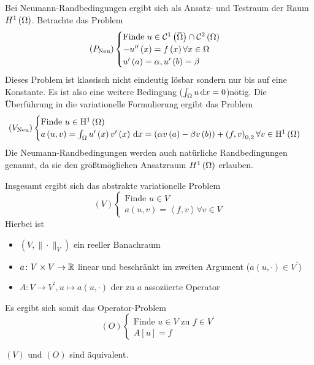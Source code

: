 Bei Neumann-Randbedingungen ergibt sich als Ansatz- und Testraum der Raum $H^{1}\left(\Omega\right)$. Betrachte das Problem
\begin{equation*}
	\left(P_{\text{Neu}}\right)\begin{cases}
		\text{Finde } u\in\C^{1}\left(\overbar{\W}\right)\cap\C^{2}\left(\W\right)\\
		-u^{\prime\prime}\left(x\right) = f\left(x\right) \forall x\in\W\\
		u^{\prime}\left(a\right) = \alpha, u^{\prime}\left(b\right) = \beta
	\end{cases}
\end{equation*}
Dieses Problem ist klassisch nicht eindeutig lösbar sondern nur bis auf eine Konstante. Es ist also eine weitere Bedingung ($\int_{\Omega}u\,\mathrm{d} x = 0$)nötig.
Die Überführung in die variationelle Formulierung ergibt das Problem
\begin{equation*}
	\left(V_{\text{Neu}}\right) \begin{cases}
		\text{Finde } u\in\mathrm{H}^{1}\left(\Omega\right)\\
		a\left(u,v\right) = \int_{\Omega}u^{\prime}\left(x\right)v^{\prime}\left(x\right)\,\mathrm{d} x = \left(\alpha v\left(a\right)-\beta v\left(b\right)\right) + \left(f,v\right)_{0,2} \forall v\in\mathrm{H}^{1}\left(\Omega\right)
	\end{cases}
\end{equation*}
Die Neumann-Randbedingungen werden auch natürliche Randbedingungen genannt, da sie den größtmöglichen Ansatzraum $H^{1}\left(\Omega\right)$ erlauben.

Insgesamt ergibt sich das abstrakte variationelle Problem
\begin{equation*}
	\left(V\right)\begin{cases}
		\text{Finde }u\in V\\
		a\left(u,v\right) = \left<f,v\right> \forall v\in V
	\end{cases}
\end{equation*}
Hierbei ist 
\begin{itemize}
	\item $\left(V,\|\cdot\|_{V}\right)$ ein reeller Banachraum
	\item $a\colon V\times V\to\mathbb{R}$ linear und beschränkt im zweiten Argument ($a\left(u,\cdot\right)\in V^{\prime}$)
	\item $A\colon V \to V^{\prime}, u\mapsto a\left(u,\cdot\right)$ der zu $a$ assoziierte Operator
\end{itemize}
Es ergibt sich somit das Operator-Problem
\begin{equation*}
	\left(O\right) \begin{cases}
		\text{Finde }u\in V \text{ zu } f\in V^{\prime}\\
		A\left[u\right] = f
	\end{cases}
\end{equation*}
\begin{lemma}
	$\left(V\right)$ und $\left(O\right)$ sind äquivalent.
\end{lemma}

